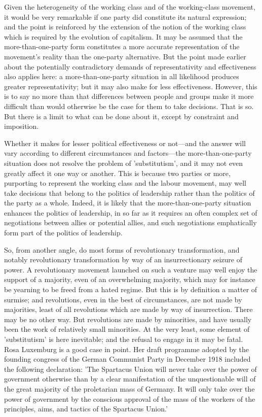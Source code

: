 Given the heterogeneity of the working class and of the working-class movement, it would be very remarkable if one party did constitute its natural expression; and the point is reinforced by the extension of the notion of the working class which is required by the evolution of capitalism. It may be assumed that the more-than-one-party form constitutes a more accurate representation of the movement's reality than the one\hyp{}party alternative. But the point made earlier about the potentially contradictory demands of representativity and effectiveness also applies here: a more-than-one-party situation in all likelihood produces greater representativity; but it may also make for less effectiveness. However, this is to say no more than that differences between people and groups make it more difficult than would otherwise be the case for them to take decisions. That is so. But there is a limit to what can be done about it, except by constraint and imposition.

Whether it makes for lesser political effectiveness or not—and the answer will vary according to different circumstances and factors—the more-than-one-party situation does not resolve the problem of 'substitutism', and it may not even greatly affect it one way or another. This is because two parties or more, purporting to represent the working class and the labour movement, may well take decisions that belong to the politics of leadership rather than the politics of the party as a whole. Indeed, it is likely that the more-than-one-party situation enhances the politics of leadership, in so far as it requires an often complex set of negotiations between allies or potential allies, and such negotiations emphatically form part of the politics of leadership.

So, from another angle, do most forms of revolutionary transformation, and notably revolutionary transformation by way of an insurrectionary seizure of power. A revolutionary movement launched on such a venture may well enjoy the support of a majority, even of an overwhelming majority, which may for instance be yearning to be freed from a hated regime. But this is by definition a matter of surmise; and revolutions, even in the best of circumstances, are not made by majorities, least of all revolutions which are made by way of insurrection. There may be no other way. But revolutions are made by minorities, and have usually been the work of relatively small minorities. At the very least, some element of 'substitutism' is here inevitable; and the refusal to engage in it may be fatal. Rosa Luxemburg is a good case in point. Her draft programme adopted by the founding congress of the German Communist Party in December 1918 included the following declaration: 'The Spartacus Union will never take over the power of government otherwise than by a clear manifestation of the unquestionable will of the great majority of the proletarian mass of Germany. It will only take over the power of government by the conscious approval of the mass of  the workers of the principles, aims, and tactics of the Spartacus Union.'

